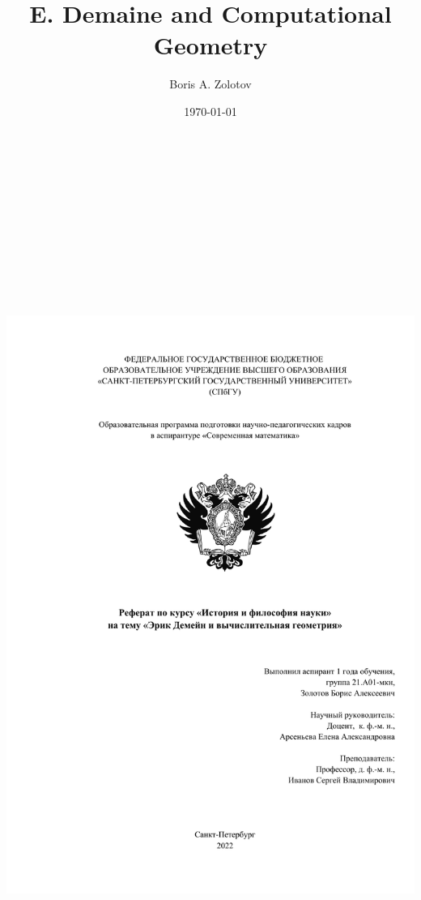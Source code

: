 \documentclass[a4paper,12pt]{article}
\begin{document}
\thispagestyle{empty}


\title{E. Demaine and Computational Geometry}
\author{Boris A. Zolotov}
\date{\today}

\begin{center}
	\includegraphics[height=28.7cm]{titlepdfpage}
\end{center}
\end{document}
